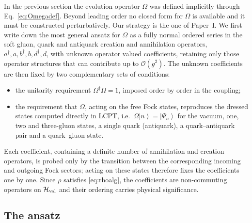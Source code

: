 \documentclass[11pt,a4paper]{article}
\numberwithin{equation}{section}
\newcommand{\dg}{\dagger}
\newcommand{\ket}[1]{\left|#1\right\rangle}
\newcommand{\OM}{\Omega}
\newcommand{\order}[1]{\mathcal{O}(#1)}
\begin{document}
In the previous section the evolution operator $\OM$ was defined implicitly through
Eq.~\eqref{eq:Omegadef}. Beyond leading order no closed form for $\OM$ is available and it must
be constructed perturbatively. Our strategy is the one of Paper~I. We first write down the most
general ansatz for $\OM$ as a fully normal ordered series in the soft gluon, quark and antiquark
creation and annihilation operators, $a^{\dg},a,b^{\dg},b,d^{\dg},d$, with unknown operator valued
coefficients, retaining only those operator structures that can contribute up to $\order{g^{2}}$.
The unknown coefficients are then fixed by two complementary sets of conditions:
\begin{itemize}
\item the unitarity requirement $\OM^{\dg}\OM=1$, imposed order by order in the coupling;
\item the requirement that $\OM$, acting on the free Fock states, reproduces the dressed states
computed directly in LCPT, i.e.\ $\OM\ket{n}=\ket{\Psi_{n}}$ for the vacuum, one, two and
three-gluon states, a single quark (antiquark), a quark--antiquark pair and a quark--gluon state.
\end{itemize}
Each coefficient, containing a definite number of annihilation and creation operators, is probed
only by the transition between the corresponding incoming and outgoing Fock sectors; acting on
these states therefore fixes the coefficients one by one. Since $\rho$ satisfies
\eqref{eq:rhoalg}, the coefficients are non-commuting operators on $\mathcal H_{\rm val}$ and
their ordering carries physical significance.

\subsection*{The ansatz}
\label{sec:ansatz}
\end{document}
